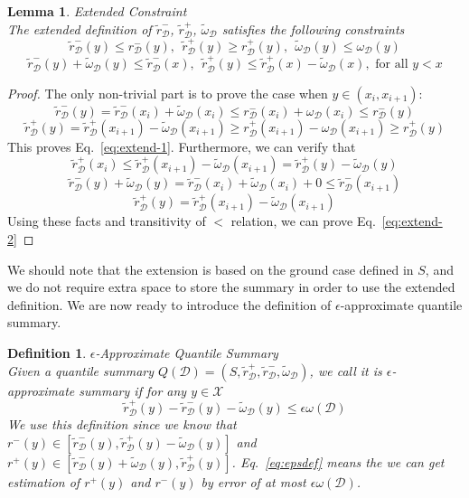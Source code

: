 \documentclass{sig-alternate-05-2015}
\newcommand{\eps}{\epsilon}
\newcommand{\w}{\omega}
\newcommand{\sX}{\mathcal{X}}
\newcommand{\sD}{\mathcal{D}}
\newcommand{\tdr}{\tilde{r}_{\sD}}
\newcommand{\tdw}{\tilde{\omega}_{\sD}}
\newtheorem{thm:def}{Definition}[section]
\newtheorem{thm:lemma}{Lemma}[section]
\begin{document}
\begin{thm:lemma}\label{lem:ext-constraint}{Extended Constraint}\\
The extended definition of $\tdr^-$, $\tdr^+$, $\tdw$ satisfies the following constraints
\begin{equation}\label{eq:extend-1}
     \tdr^-(y) \leq r^-_{\sD}(y),\ \  \tdr^+(y) \geq r^+_{\sD}(y), \ \ \tdw(y)\leq \w_{\sD}(y)
\end{equation}
\begin{equation} \label{eq:extend-2}
\tdr^-(y) + \tdw(y)\leq \tdr^-(x), \ \ \tdr^+(y) \leq \tdr^+(x) - \tdw(x), \mbox{ for all } y < x
\end{equation}
\end{thm:lemma}
\begin{proof}
The only non-trivial part is to prove the case when $y \in (x_i, x_{i+1})$:
$$
\tdr^-(y) = \tdr^-(x_i)+\tdw(x_i) \leq r_{\sD}^-(x_i) +   \w_{\sD}(x_i) \leq  r_{\sD}^-(y)
$$
$$
\tdr^+(y) = \tdr^+(x_{i+1})-\tdw(x_{i+1}) \geq r_{\sD}^+(x_{i+1}) - \w_{\sD}(x_{i+1}) \geq  r_{\sD}^+(y)
$$
This proves Eq.~\eqref{eq:extend-1}.
Furthermore, we can verify that
$$
\tdr^+(x_{i}) \leq \tdr^+(x_{i+1}) - \tdw(x_{i+1}) =  \tdr^+(y) -\tdw(y)
$$
$$
\tdr^-(y) +\tdw(y) = \tdr^-(x_i)+\tdw(x_i) + 0 \leq   \tdr^-(x_{i+1})
$$
$$
\tdr^+(y)= \tdr^+(x_{i+1}) - \tdw(x_{i+1})
$$
Using these facts and transitivity of $<$ relation, we can prove Eq.~\eqref{eq:extend-2}
\end{proof}
We should note that the extension is based on the ground case defined in $S$, and we do not require extra space to store the summary in order to use the extended definition. We are now ready to introduce the definition of $\eps$-approximate quantile summary.
\begin{thm:def}{$\eps$-Approximate Quantile Summary}\\
Given a quantile summary $Q(\sD) = (S, \tdr^+, \tdr^-, \tdw)$, we call it is $\eps$-approximate summary if for any $ y \in \sX$
\begin{equation}\label{eq:epsdef}
\tdr^{+}(y) - \tdr^{-}(y) - \tdw(y) \leq  \eps \w(\sD)
\end{equation}
We use this definition since we know that $r^-(y)\in[\tdr^{-}(y), \tdr^{+}(y) -\tdw(y)] $ and $r^+(y)\in[\tdr^{-}(y)+\tdw(y), \tdr^{+}(y)] $. Eq.~\eqref{eq:epsdef} means the we can get estimation of $r^+(y)$ and $r^-(y)$ by error of at most $ \eps \w(\sD)$.
\end{thm:def}
\end{document}
